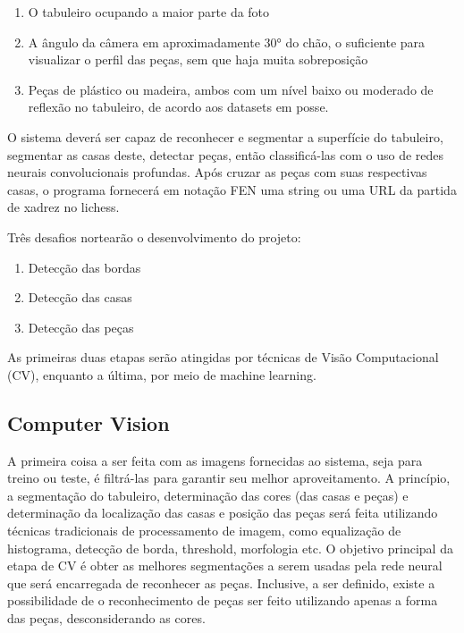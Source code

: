 \documentclass[a4paper,12pt,twoside]{article}
\begin{document}
\begin{enumerate}
    \item{O tabuleiro ocupando a maior parte da foto}
    \item{A ângulo da câmera em aproximadamente 30° do chão,
          o suficiente para visualizar o perfil das peças, sem que haja muita sobreposição}
    \item{Peças de plástico ou madeira, ambos com um nível baixo ou moderado de reflexão no tabuleiro,
          de acordo aos datasets em posse.}
\end{enumerate}

O sistema deverá ser capaz de reconhecer e segmentar a superfície do tabuleiro,
segmentar as casas deste, detectar peças,
então classificá-las com o uso de redes neurais convolucionais profundas.
Após cruzar as peças com suas respectivas casas,
o programa fornecerá em notação FEN uma string ou uma URL da partida de xadrez no lichess.

Três desafios nortearão o desenvolvimento do projeto:

\begin{enumerate}
    \item{Detecção das bordas}
    \item{Detecção das casas}
    \item{Detecção das peças}
\end{enumerate}

As primeiras duas etapas serão atingidas por técnicas de Visão Computacional (CV),
enquanto a última, por meio de machine learning.

\subsection{Computer Vision}

A primeira coisa a ser feita com as imagens fornecidas ao sistema,
seja para treino ou teste, é filtrá-las para garantir seu melhor aproveitamento.
A princípio, a segmentação do tabuleiro,
determinação das cores (das casas e peças) e determinação da localização das casas e posição das peças
será feita utilizando técnicas tradicionais de processamento de imagem,
como equalização de histograma, detecção de borda, threshold, morfologia etc.
O objetivo principal da etapa de CV é obter as melhores segmentações a serem usadas pela rede neural
que será encarregada de reconhecer as peças.
Inclusive, a ser definido, existe a possibilidade de o reconhecimento de peças ser feito utilizando apenas a forma das peças,
desconsiderando as cores.
\end{document}
